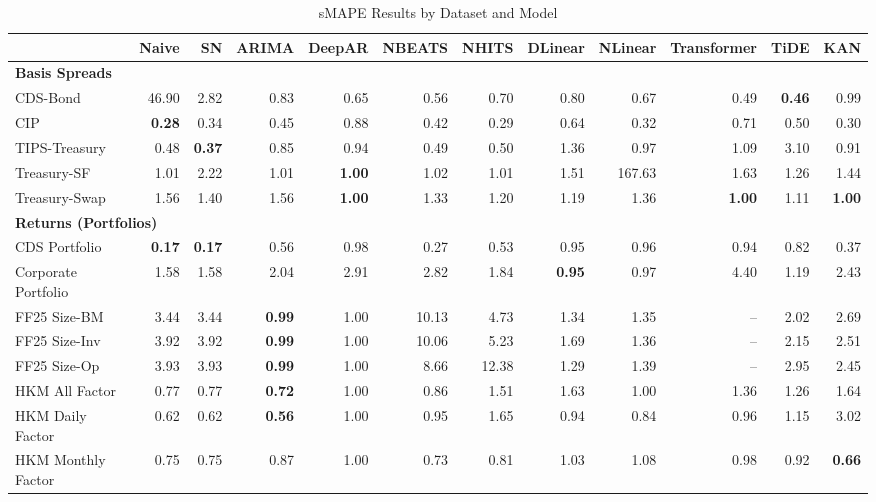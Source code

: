 
\begin{table}[htbp]
\centering
\caption{sMAPE Results by Dataset and Model}
\label{tab:smape_results}
\scriptsize
\setlength{\tabcolsep}{1.5pt}
\renewcommand{\arraystretch}{0.9}
\begin{tabular}{@{}lrrrrrrrrrrr@{}}
\toprule
 & Naive & SN & ARIMA & DeepAR & NBEATS & NHITS & DLinear & NLinear & Transformer & TiDE & KAN \\
\midrule
\multicolumn{12}{l}{\textbf{Basis Spreads}} \\
CDS-Bond & 46.90 & 2.82 & 0.83 & 0.65 & 0.56 & 0.70 & 0.80 & 0.67 & 0.49 & \textbf{0.46} & 0.99 \\
CIP & \textbf{0.28} & 0.34 & 0.45 & 0.88 & 0.42 & 0.29 & 0.64 & 0.32 & 0.71 & 0.50 & 0.30 \\
TIPS-Treasury & 0.48 & \textbf{0.37} & 0.85 & 0.94 & 0.49 & 0.50 & 1.36 & 0.97 & 1.09 & 3.10 & 0.91 \\
Treasury-SF & 1.01 & 2.22 & 1.01 & \textbf{1.00} & 1.02 & 1.01 & 1.51 & 167.63 & 1.63 & 1.26 & 1.44 \\
Treasury-Swap & 1.56 & 1.40 & 1.56 & \textbf{1.00} & 1.33 & 1.20 & 1.19 & 1.36 & \textbf{1.00} & 1.11 & \textbf{1.00} \\
\midrule
\multicolumn{12}{l}{\textbf{Returns (Portfolios)}} \\
CDS Portfolio & \textbf{0.17} & \textbf{0.17} & 0.56 & 0.98 & 0.27 & 0.53 & 0.95 & 0.96 & 0.94 & 0.82 & 0.37 \\
Corporate Portfolio & 1.58 & 1.58 & 2.04 & 2.91 & 2.82 & 1.84 & \textbf{0.95} & 0.97 & 4.40 & 1.19 & 2.43 \\
FF25 Size-BM & 3.44 & 3.44 & \textbf{0.99} & 1.00 & 10.13 & 4.73 & 1.34 & 1.35 & -- & 2.02 & 2.69 \\
FF25 Size-Inv & 3.92 & 3.92 & \textbf{0.99} & 1.00 & 10.06 & 5.23 & 1.69 & 1.36 & -- & 2.15 & 2.51 \\
FF25 Size-Op & 3.93 & 3.93 & \textbf{0.99} & 1.00 & 8.66 & 12.38 & 1.29 & 1.39 & -- & 2.95 & 2.45 \\
HKM All Factor & 0.77 & 0.77 & \textbf{0.72} & 1.00 & 0.86 & 1.51 & 1.63 & 1.00 & 1.36 & 1.26 & 1.64 \\
HKM Daily Factor & 0.62 & 0.62 & \textbf{0.56} & 1.00 & 0.95 & 1.65 & 0.94 & 0.84 & 0.96 & 1.15 & 3.02 \\
HKM Monthly Factor & 0.75 & 0.75 & 0.87 & 1.00 & 0.73 & 0.81 & 1.03 & 1.08 & 0.98 & 0.92 & \textbf{0.66} \\

\end{tabular}
\end{table}

